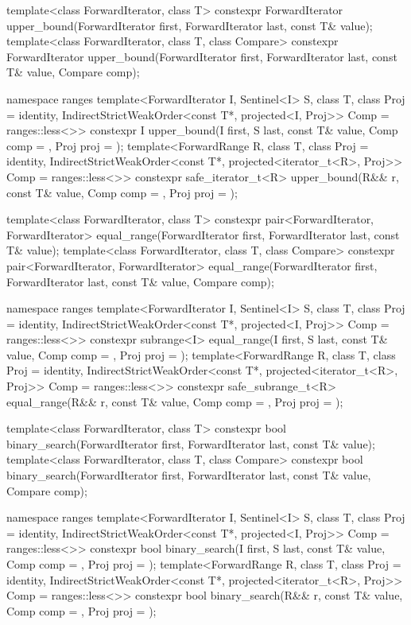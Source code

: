 \begin{codeblock}
{  template<class ForwardIterator, class T>
    constexpr ForwardIterator
      upper_bound(ForwardIterator first, ForwardIterator last,
                  const T& value);
  template<class ForwardIterator, class T, class Compare>
    constexpr ForwardIterator
      upper_bound(ForwardIterator first, ForwardIterator last,
                  const T& value, Compare comp);

  namespace ranges {
    template<ForwardIterator I, Sentinel<I> S, class T, class Proj = identity,
        IndirectStrictWeakOrder<const T*, projected<I, Proj>> Comp = ranges::less<>>
      constexpr I upper_bound(I first, S last, const T& value, Comp comp = {}, Proj proj = {});
    template<ForwardRange R, class T, class Proj = identity,
        IndirectStrictWeakOrder<const T*, projected<iterator_t<R>, Proj>> Comp = ranges::less<>>
      constexpr safe_iterator_t<R>
        upper_bound(R&& r, const T& value, Comp comp = {}, Proj proj = {});
  }

  template<class ForwardIterator, class T>
    constexpr pair<ForwardIterator, ForwardIterator>
      equal_range(ForwardIterator first, ForwardIterator last,
                  const T& value);
  template<class ForwardIterator, class T, class Compare>
    constexpr pair<ForwardIterator, ForwardIterator>
      equal_range(ForwardIterator first, ForwardIterator last,
                  const T& value, Compare comp);

  namespace ranges {
    template<ForwardIterator I, Sentinel<I> S, class T, class Proj = identity,
        IndirectStrictWeakOrder<const T*, projected<I, Proj>> Comp = ranges::less<>>
      constexpr subrange<I>
        equal_range(I first, S last, const T& value, Comp comp = {}, Proj proj = {});
    template<ForwardRange R, class T, class Proj = identity,
        IndirectStrictWeakOrder<const T*, projected<iterator_t<R>, Proj>> Comp = ranges::less<>>
      constexpr safe_subrange_t<R>
        equal_range(R&& r, const T& value, Comp comp = {}, Proj proj = {});
  }

  template<class ForwardIterator, class T>
    constexpr bool
      binary_search(ForwardIterator first, ForwardIterator last,
                    const T& value);
  template<class ForwardIterator, class T, class Compare>
    constexpr bool
      binary_search(ForwardIterator first, ForwardIterator last,
                    const T& value, Compare comp);

  namespace ranges {
    template<ForwardIterator I, Sentinel<I> S, class T, class Proj = identity,
        IndirectStrictWeakOrder<const T*, projected<I, Proj>> Comp = ranges::less<>>
      constexpr bool binary_search(I first, S last, const T& value, Comp comp = {},
                                   Proj proj = {});
    template<ForwardRange R, class T, class Proj = identity,
        IndirectStrictWeakOrder<const T*, projected<iterator_t<R>, Proj>> Comp = ranges::less<>>
      constexpr bool binary_search(R&& r, const T& value, Comp comp = {},
                                   Proj proj = {});
  }

}
\end{codeblock}
